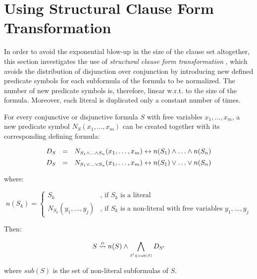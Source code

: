 \section{Using Structural Clause Form Transformation}
\label{sec:StructuralClauseForm}


In order to avoid the exponential blow-up in the size of the clause set altogether, this section investigates the use of \emph{structural clause form transformation} \cite{BaazEglyLeitsch2001NormalFormTransformations}, which avoids the distribution of disjunction over conjunction by introducing new defined predicate symbols for each subformula of the formula to be normalized. The number of new predicate symbols is, therefore, linear w.r.t. to the size of the formula. Moreover, each literal is duplicated only a constant number of times. 


\begin{definition}[$\normalizePlusTimesD$]
\label{definition:NormalizationPlusTimesDefinitional}
For every conjunctive or disjunctive formula $S$ with free variables $x_1,\ldots, x_m$, a new predicate symbol $N_{S}(x_1,\ldots, x_m)$ can be created together with its corresponding defining formula:
%
\begin{small}
$$
D_{S} \ \ = \ \
N_{S_1 \wedge \ldots \wedge S_n}(x_1,\ldots, x_m) 
\leftrightarrow n(S_1) \wedge \ldots \wedge n(S_n)
$$
$$
D_{S} \ \ = \ \  
N_{S_1 \vee \ldots \vee S_n}(x_1,\ldots, x_m) 
\leftrightarrow n(S_1) \vee \ldots \vee n(S_n)
$$
\end{small}
where:
\begin{small}
$$
n(S_k) = \left\{ \begin{array}{ll}
S_k & \textrm{, if } S_k \textrm{ is a literal} \\
N_{S_k}(y_1,\ldots, y_j) & \textrm{, if } S_k \textrm{ is a non-literal with free variables } y_1,\ldots, y_j
\end{array}\right.
$$
\end{small}

\noindent
Then:
\begin{small}
$$
S \normalizePlusTimesD n(S) \structplus \structplusBig_{\scriptscriptstyle S' \in sub(S) } D_{S'}
$$
\end{small}
where $sub(S)$ is the set of non-literal subformulas of $S$.
\end{definition}

